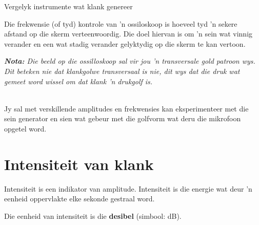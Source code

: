 \begin{activity}{Vergelyk instrumente wat klank genereer}
\begin{minipage}{.5\textwidth}
 	
Die frekwensie (of tyd) kontrole van 'n ossiloskoop is hoeveel tyd 'n sekere afstand op die skerm verteenwoordig. Die doel hiervan is om 'n sein wat vinnig verander en een wat stadig verander gelyktydig op die skerm te kan vertoon.\\
\end{minipage}
\begin{minipage}{.5\textwidth}
\begin{center}
\begin{minipage}{.8\textwidth}
\vspace{.5cm}\textsl{\textbf{Nota:} Die beeld op die ossilloskoop sal vir jou 'n transversale gold patroon wys. Dit beteken nie dat klankgolwe transversaal is nie, dit wys dat die druk wat gemeet word wissel om dat klank 'n drukgolf is.}
\end{minipage}
\end{center}
\end{minipage}
\vspace{1em}\\
Jy sal met verskillende amplitudes en frekwensies kan eksperimenteer met die sein generator en sien wat gebeur met die golfvorm wat deru die mikrofoon opgetel word.\\


\end{activity}



\section*{Intensiteit van klank}
\nopagebreak

\par
Intensiteit is een indikator van amplitude. Intensiteit is die energie wat deur 'n eenheid oppervlakte elke sekonde gestraal word.\par

Die eenheid van intensiteit is die \textbf{desibel} (simbool: dB).

